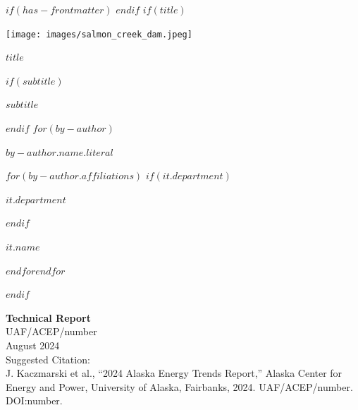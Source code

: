 
$if(has-frontmatter)$
\frontmatter
$endif$
$if(title)$
\cleardoublepage
\thispagestyle{empty}
{\centering
\vspace*{-3cm}
\vspace{2ex}
\par\noindent\texttt{[image: images/salmon\_creek\_dam.jpeg]}
\\
\vspace{7ex}
{\huge\bfseries\color{uafblue} $title$ \par}
\vspace{3ex}
$if(subtitle)$
{\Large $subtitle$ \par}
$endif$
\vspace{15ex}
$for(by-author)$
{\Large $by-author.name.literal$ \par}
\vspace{3ex}
\vspace{12ex}
$for(by-author.affiliations)$%
$if(it.department)$%
{\bfseries\large $it.department$ \par}
\vspace{3ex}
$endif$%
{\bfseries\large $it.name$ \par}
$endfor$$endfor$%
}
$endif$

\newpage
\noindent
{\normalsize\bfseries Technical Report} \\
UAF/ACEP/number \\ 
\vspace{3ex}
August 2024 \\
Suggested Citation: \\
J. Kaczmarski et al., “2024 Alaska Energy Trends Report,” Alaska Center for Energy and Power, University of Alaska, Fairbanks, 2024. UAF/ACEP/number. DOI:number. 

